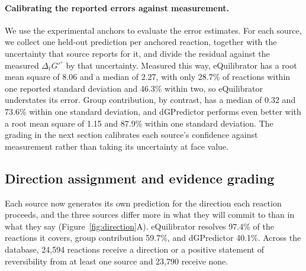 \documentclass[unnumsec,webpdf,modern,large]{oup-authoring-template}
\newcommand{\drGo}{$\Delta_{\mathrm{r}}G'^{\circ}$} %
\begin{document}
\paragraph{Calibrating the reported errors against measurement.} We use the experimental anchors to evaluate the error estimates.
For each source, we collect one held-out prediction per anchored reaction, together with the uncertainty that source reports for it, and divide the residual against the measured \drGo{} by that uncertainty.
Measured this way, eQuilibrator has a root mean square of 8.06 and a median of 2.27, with only 28.7\% of reactions within one reported standard deviation and 46.3\% within two, so eQuilibrator understates its error.
Group contribution, by contrast, has a median of 0.32 and 73.6\% within one standard deviation, and dGPredictor performs even better with a root mean square of 1.15 and 87.9\% within one standard deviation.
The grading in the next section calibrates each source's confidence against measurement rather than taking its uncertainty at face value.
\subsection{Direction assignment and evidence grading}\label{sec:results-direction}

Each source now generates its own prediction for the direction each reaction proceeds, and the three sources differ more in what they will commit to than in what they say (Figure~\ref{fig:direction}A).
eQuilibrator resolves 97.4\% of the reactions it covers, group contribution 59.7\%, and dGPredictor 40.1\%.
Across the database, 24,594 reactions receive a direction or a positive statement of reversibility from at least one source and 23,790 receive none.
\end{document}
